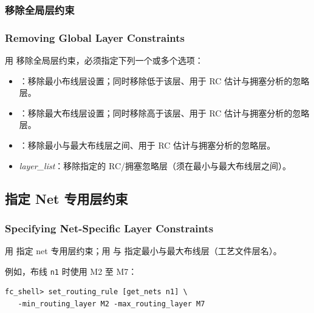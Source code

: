 \subsubsection{移除全局层约束}
\subsubsection*{Removing Global Layer Constraints}

用  移除全局层约束，必须指定下列一个或多个选项：
\begin{itemize}
  \item {}：移除最小布线层设置；同时移除低于该层、用于 RC 估计与拥塞分析的忽略层。
  \item {}：移除最大布线层设置；同时移除高于该层、用于 RC 估计与拥塞分析的忽略层。
  \item {}：移除最小与最大布线层之间、用于 RC 估计与拥塞分析的忽略层。
  \item {} \textit{layer\_list}：移除指定的 RC/拥塞忽略层（须在最小与最大布线层之间）。
\end{itemize}

\subsection{指定 Net 专用层约束}
\subsubsection*{Specifying Net-Specific Layer Constraints}

用  指定 net 专用层约束；用  与  指定最小与最大布线层（工艺文件层名）。

例如，布线 \texttt{n1} 时使用 M2 至 M7：
\begin{lstlisting}
fc_shell> set_routing_rule [get_nets n1] \
   -min_routing_layer M2 -max_routing_layer M7
\end{lstlisting}

